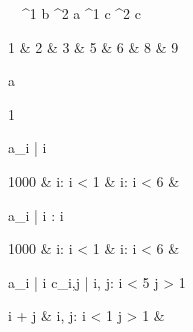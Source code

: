 \begin{eqcode}{\mu}{\ }{\ }{^1}
  b ^2 \lend
  a \in {}^1 \lend
  c \in {}^2 \lend
  c \gets \begin{tmatrix}
    1 & 2 & 3  & 5 & 6  & 8 & 9 \lend
  \end{tmatrix} \lend
  a \gets 
  \begin{tmatrix}
    1   \lend
  \end{tmatrix} \lend
  a_i | \forall i \gets 
  \begin{cases}
    1000 & i: i < 1  & i: i < 6  & \otherwise \lend
  \end{cases}\lend



  a_i | i : i  \gets
  \begin{cases}
    1000 & i: i < 1  & i: i < 6  & \otherwise \lend
  \end{cases}\lend

  a_i | \forall i  \lend
  c_{i,j} | i, j: i < 5 \cap j > 1 \gets 
  \begin{cases}
    i + j & i, j: i < 1 \cap j > 1  & \otherwise \lend
  \end{cases} \lend
   \lend
\end{eqcode}

